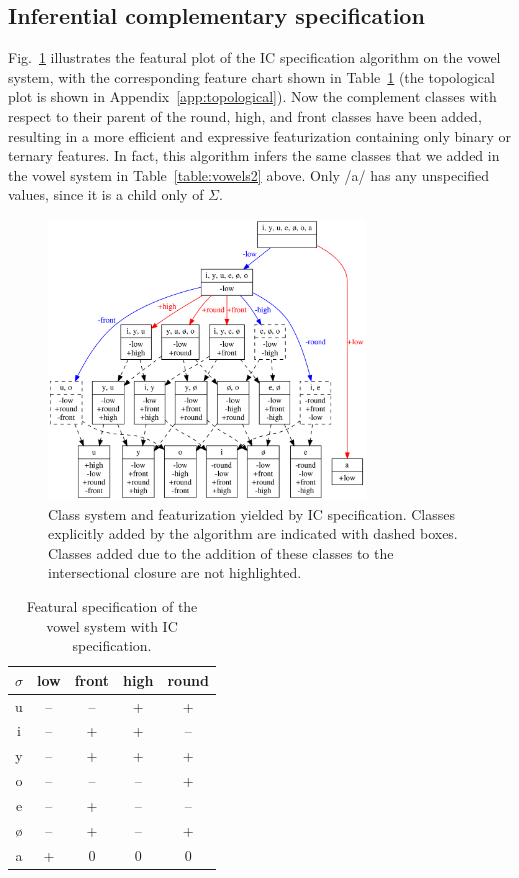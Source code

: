 \documentclass[12pt, oneside]{article}   	%
\begin{document}
\subsection{Inferential complementary specification}

Fig.~\ref{fig:vowel_inventory_ic} illustrates the featural plot of the IC specification algorithm on the vowel system, with the corresponding feature chart shown in Table~\ref{table:vowel_inventory_ic} (the topological plot is shown in Appendix~\ref{app:topological}). Now the complement classes with respect to their parent of the round, high, and front classes have been added, resulting in a more efficient and expressive featurization containing only binary or ternary features. In fact, this algorithm infers the same classes that we added in the vowel system in Table~\ref{table:vowels2} above. Only /a/ has any unspecified values, since it is a child only of $\Sigma$.

\begin{figure}[htb!]
	\centering
	\includegraphics[width=0.75\textwidth]{vowel_inventory_ic_FEATURAL.png}
	\caption{Class system and featurization yielded by IC specification. Classes explicitly added by the algorithm are indicated with dashed boxes. Classes added due to the addition of these classes to the intersectional closure are not highlighted.}
	\label{fig:vowel_inventory_ic}
\end{figure}

\begin{table}[htb!]
	\centering
	\begin{tabular} {|c||c|c|c|c|}
		\hline
		$\sigma$ & low & front & high & round \\ \hline
		u & -- & -- & + & + \\
		i & -- & + & + & -- \\
		y & -- & + & + & + \\
		o & -- & -- & -- & + \\
		e & -- & + & -- & -- \\
		\o & -- & + & -- & + \\
		a & + & 0 & 0 & 0 \\
		\hline
	\end{tabular}
	\caption{Featural specification of the vowel system with IC specification.}
	\label{table:vowel_inventory_ic}
\end{table}
\end{document}
